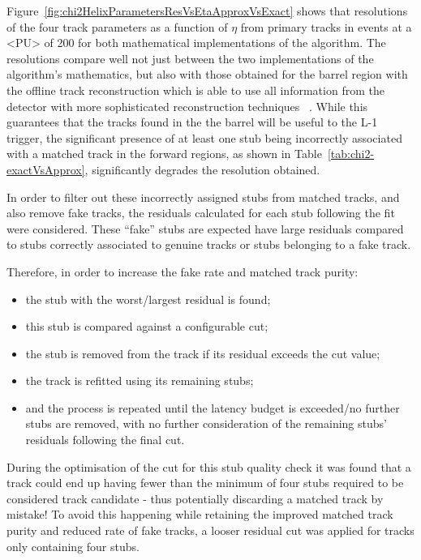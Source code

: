 
Figure~\ref{fig:chi2HelixParametersResVsEtaApproxVsExact} shows that resolutions of the four track parameters as a function of $\eta$ from primary tracks in \ttbar events at a <PU> of 200 for both mathematical implementations of the algorithm.
The resolutions compare well not just between the two implementations of the algorithm's mathematics, but also with those obtained for the barrel region with the offline track reconstruction which is able to use all information from the detector with more sophisticated reconstruction techniques ~\cite{P2TrackerTDR}.
While this guarantees that the tracks found in the the barrel will be useful to the L-1 trigger, the significant presence of at least one stub being incorrectly associated with a matched track in the forward regions, as shown in Table~\ref{tab:chi2-exactVsApprox}, significantly degrades the resolution obtained.

In order to filter out these incorrectly assigned stubs from matched tracks, and also remove fake tracks, the residuals calculated for each stub following the fit were considered.
These ``fake'' stubs are expected have large residuals compared to stubs correctly associated to genuine tracks or stubs belonging to a fake track.

Therefore, in order to increase the fake rate and matched track purity:
\begin{itemize}
\item the stub with the worst/largest residual is found;
\item this stub is compared against a configurable cut;
\item the stub is removed from the track if its residual exceeds the cut value;
\item the track is refitted using its remaining stubs;
\item and the process is repeated until the latency budget is exceeded/no further stubs are removed, with no further consideration of the remaining stubs' residuals following the final cut.
\end{itemize}

During the optimisation of the cut for this stub quality check it was found that a track could end up having fewer than the minimum of four stubs required to be considered track candidate - thus potentially discarding a matched track by mistake!
To avoid this happening while retaining the improved matched track purity and reduced rate of fake tracks, a looser residual cut was applied for tracks only containing four stubs.

